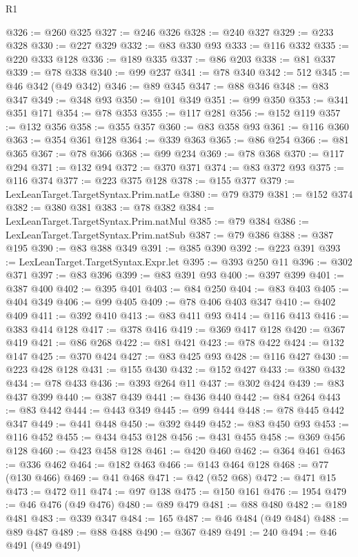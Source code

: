 \begin{lexlean}{R1}
\begin{coremodule}
@326 := @260 @325
@327 := @246 @326
@328 := @240 @327
@329 := @233 @328
@330 := @227 @329
@332 := @83 @330 @93
@333 := @116 @332
@335 := @220 @333 @128
@336 := @189 @335
@337 := @86 @203
@338 := @81 @337
@339 := @78 @338
@340 := @99 @237
@341 := @78 @340
@342 := 512
@345 := @46 @342 (@49 @342)
@346 := @89 @345
@347 := @88 @346
@348 := @83 @347
@349 := @348 @93
@350 := @101 @349
@351 := @99 @350
@353 := @341 @351 @171
@354 := @78 @353
@355 := @117 @281
@356 := @152 @119
@357 := @132 @356
@358 := @355 @357
@360 := @83 @358 @93
@361 := @116 @360
@363 := @354 @361 @128
@364 := @339 @363
@365 := @86 @254
@366 := @81 @365
@367 := @78 @366
@368 := @99 @234
@369 := @78 @368
@370 := @117 @294
@371 := @132 @94
@372 := @370 @371
@374 := @83 @372 @93
@375 := @116 @374
@377 := @223 @375 @128
@378 := @155 @377
@379 := LexLeanTarget.TargetSyntax.Prim.natLe
@380 := @79 @379
@381 := @152 @374
@382 := @380 @381
@383 := @78 @382
@384 := LexLeanTarget.TargetSyntax.Prim.natMul
@385 := @79 @384
@386 := LexLeanTarget.TargetSyntax.Prim.natSub
@387 := @79 @386
@388 := @387 @195
@390 := @83 @388 @349
@391 := @385 @390
@392 := @223 @391
@393 := LexLeanTarget.TargetSyntax.Expr.let
@395 := @393 @250 @11
@396 := @302 @371
@397 := @83 @396
@399 := @83 @391 @93
@400 := @397 @399
@401 := @387 @400
@402 := @395 @401
@403 := @84 @250
@404 := @83 @403
@405 := @404 @349
@406 := @99 @405
@409 := @78 @406 @403 @347
@410 := @402 @409
@411 := @392 @410
@413 := @83 @411 @93
@414 := @116 @413
@416 := @383 @414 @128
@417 := @378 @416
@419 := @369 @417 @128
@420 := @367 @419
@421 := @86 @268
@422 := @81 @421
@423 := @78 @422
@424 := @132 @147
@425 := @370 @424
@427 := @83 @425 @93
@428 := @116 @427
@430 := @223 @428 @128
@431 := @155 @430
@432 := @152 @427
@433 := @380 @432
@434 := @78 @433
@436 := @393 @264 @11
@437 := @302 @424
@439 := @83 @437 @399
@440 := @387 @439
@441 := @436 @440
@442 := @84 @264
@443 := @83 @442
@444 := @443 @349
@445 := @99 @444
@448 := @78 @445 @442 @347
@449 := @441 @448
@450 := @392 @449
@452 := @83 @450 @93
@453 := @116 @452
@455 := @434 @453 @128
@456 := @431 @455
@458 := @369 @456 @128
@460 := @423 @458 @128
@461 := @420 @460
@462 := @364 @461
@463 := @336 @462
@464 := @182 @463
@466 := @143 @464 @128
@468 := @77 (@130 @466)
@469 := @41 @468
@471 := @42 (@52 @68)
@472 := @471 @15
@473 := @472 @11
@474 := @97 @138
@475 := @150 @161
@476 := 1954
@479 := @46 @476 (@49 @476)
@480 := @89 @479
@481 := @88 @480
@482 := @189 @481
@483 := @339 @347
@484 := 165
@487 := @46 @484 (@49 @484)
@488 := @89 @487
@489 := @88 @488
@490 := @367 @489
@491 := 240
@494 := @46 @491 (@49 @491)

\end{coremodule}
\end{lexlean}
